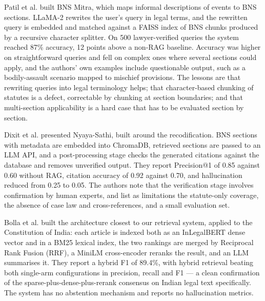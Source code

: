 \documentclass[conference]{IEEEtran}
\begin{document}
Patil et al. \cite{patil2025} built BNS Mitra, which maps informal descriptions of events to BNS sections. LLaMA-2 rewrites the user's query in legal terms, and the rewritten query is embedded and matched against a FAISS index of BNS chunks produced by a recursive character splitter. On 500 lawyer-verified queries the system reached 87\% accuracy, 12 points above a non-RAG baseline. Accuracy was higher on straightforward queries and fell on complex ones where several sections could apply, and the authors' own examples include questionable output, such as a bodily-assault scenario mapped to mischief provisions. The lessons are that rewriting queries into legal terminology helps; that character-based chunking of statutes is a defect, correctable by chunking at section boundaries; and that multi-section applicability is a hard case that has to be evaluated section by section.

Dixit et al. \cite{dixit2025} presented Nyaya-Sathi, built around the recodification. BNS sections with metadata are embedded into ChromaDB, retrieved sections are passed to an LLM API, and a post-processing stage checks the generated citations against the database and removes unverified output. They report Precision@1 of 0.85 against 0.60 without RAG, citation accuracy of 0.92 against 0.70, and hallucination reduced from 0.25 to 0.05. The authors note that the verification stage involves confirmation by human experts, and list as limitations the statute-only coverage, the absence of case law and cross-references, and a small evaluation set.

Bolla et al. \cite{bolla2026} built the architecture closest to our retrieval system, applied to the Constitution of India: each article is indexed both as an InLegalBERT dense vector and in a BM25 lexical index, the two rankings are merged by Reciprocal Rank Fusion (RRF), a MiniLM cross-encoder reranks the result, and an LLM summarises it. They report a hybrid F1 of 89.4\%, with hybrid retrieval beating both single-arm configurations in precision, recall and F1 --- a clean confirmation of the sparse-plus-dense-plus-rerank consensus on Indian legal text specifically. The system has no abstention mechanism and reports no hallucination metrics.
\end{document}
